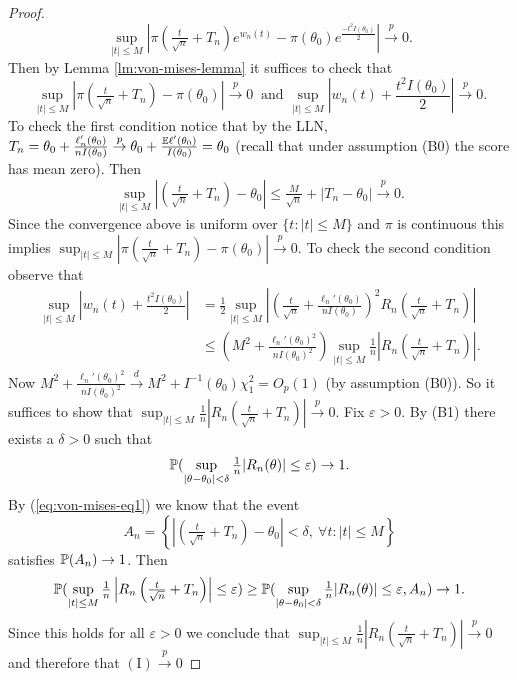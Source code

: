 \begin{proof}
\[ 		\sup_{|t| \leq M} \left| \pi\left(\tfrac{t}{\sqrt{n}} + T_n \right) e^{w_n(t)} - \pi(\theta_0) e^{\frac{-t^2 I(\theta_0)}{2}} \right|  \overset{p}{\to} 0. 
 	\] Then by Lemma \ref{lm:von-mises-lemma} it suffices to check that \[
 		\sup_{|t| \leq M} \left| \pi\left(\tfrac{t}{\sqrt{n}} + T_n \right) - \pi(\theta_0) \right|  \overset{p}{\to} 0 \ \text{ and } \sup_{|t| \leq M} \left| w_n(t) + \frac{t^2 I(\theta_0)}{2} \right|  \overset{p}{\to} 0. 
 	\] To check the first condition notice that by the LLN, $T_n = \theta_0 + \frac{\ell_n'(\theta_0)}{nI(\theta_0)} \overset{p}{\to} \theta_0 + \frac{\mathbb{E} \ell'(\theta_0)}{I(\theta_0)} = \theta_0$ (recall that under assumption (B0) the score has mean zero). Then \begin{equation}
 		\sup_{|t| \leq M} \left| \left(\tfrac{t}{\sqrt{n}} + T_n\right) - \theta_0 \right| \leq \tfrac{M}{\sqrt{n}} + |T_n - \theta_0| \overset{p}{\to} 0. \label{eq:von-mises-eq1}
 	\end{equation} Since the convergence above is uniform over $\{t : |t| \leq M\}$ and $\pi$ is continuous this implies $\sup_{|t| \leq M} \left| \pi\left(\tfrac{t}{\sqrt{n}} + T_n \right) - \pi(\theta_0) \right|  \overset{p}{\to} 0$. To check the second condition observe that \begin{align*}
 		 \sup_{|t| \leq M} \left| w_n(t) + \frac{t^2 I(\theta_0)}{2} \right| &= 
 		 \frac{1}{2} \sup_{|t| \leq M} \left| \left(\tfrac{t}{\sqrt{n}} + \frac{\ell_n'(\theta_0)}{nI(\theta_0)}\right)^2 R_n\left(\tfrac{t}{\sqrt{n}} + T_n\right)\right| \\
 		 &\leq \left(M^2 + \frac{\ell_n'(\theta_0)^2}{nI(\theta_0)^2}\right) \sup_{|t| \leq M} \tfrac{1}{n}\left|R_n\left(\tfrac{t}{\sqrt{n}} + T_n\right)\right|.
 	\end{align*} Now $M^2 + \frac{\ell_n'(\theta_0)^2}{nI(\theta_0)^2} \overset{d}{\to} M^2 + I^{-1}(\theta_0) \chi_1^2 = O_p(1)$ (by assumption (B0)). So it suffices to show that $\sup_{|t| \leq M} \tfrac{1}{n}\left|R_n\left(\tfrac{t}{\sqrt{n}} + T_n\right)\right| \overset{p}{\to} 0$. Fix $\varepsilon > 0$. By (B1) there exists a $\delta > 0$ such that \[
 	\mathbb{P}(\sup_{|\theta - \theta_0| < \delta} \tfrac{1}{n} |R_n(\theta)| \le \varepsilon) \to 1.
 	\] By (\ref{eq:von-mises-eq1}) we know that the event \[
 		A_n = \left\{ \left| \left(\tfrac{t}{\sqrt{n}} + T_n \right) - \theta_0 \right| < \delta, \ \forall t :  |t| \leq M \right\}
 	\] satisfies $\mathbb{P}(A_n) \to 1$. Then \[
 		\mathbb{P}(\sup_{|t| \leq M} \tfrac{1}{n}\left|R_n\left(\tfrac{t}{\sqrt{n}} + T_n\right)\right| \leq \varepsilon) \geq \mathbb{P}(\sup_{|\theta - \theta_0| < \delta} \tfrac{1}{n} |R_n(\theta)| \le \varepsilon, A_n) \to 1.
  	\] Since this holds for all $\varepsilon > 0$ we conclude that $\sup_{|t| \leq M} \tfrac{1}{n}\left|R_n\left(\tfrac{t}{\sqrt{n}} + T_n\right)\right| \overset{p}{\to} 0$ and therefore that $(\text{I}) \overset{p}{\to} 0$
  	

\end{proof}

